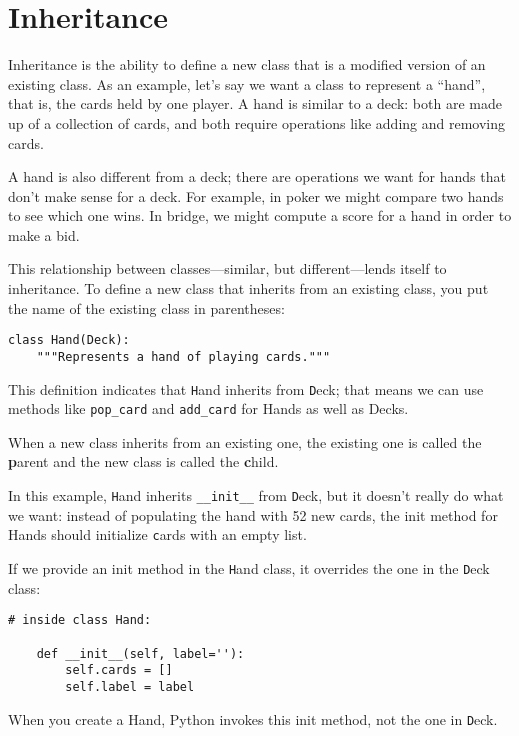 \documentclass[
DIV=11,
fontsize=13,
twoside,
headinclude=false,
titlepage=firstiscover,
abstract=true,
headsepline=true,
footsepline=true,
chapterprefix=true, %
headings=big,
bibliography=totoc,%
captions=tableheading
]{scrbook}
\theoremstyle{definition}
\begin{document}
\section{Inheritance}

Inheritance is the ability to define a new class that is a modified
version of an existing class.  As an example, let's say we want a
class to represent a ``hand'', that is, the cards held by one player.
A hand is similar to a deck: both are made up of a collection of
cards, and both require operations like adding and removing cards.

A hand is also different from a deck; there are operations we want for
hands that don't make sense for a deck.  For example, in poker we
might compare two hands to see which one wins.  In bridge, we might
compute a score for a hand in order to make a bid.

This relationship between classes---similar, but different---lends
itself to inheritance.
To define a new class that inherits from an existing class,
you put the name of the existing class in parentheses:

\begin{lstlisting}
class Hand(Deck):
    """Represents a hand of playing cards."""
\end{lstlisting}
%
This definition indicates that {\texttt Hand} inherits from {\texttt Deck};
that means we can use methods like \verb"pop_card" and \verb"add_card"
for Hands as well as Decks.

When a new class inherits from an existing one, the existing
one is called the {\textbf parent} and the new class is
called the {\textbf child}.

In this example, {\texttt Hand} inherits \verb"__init__" from {\texttt Deck},
but it doesn't really do what we want: instead of populating the hand
with 52 new cards, the init method for Hands should initialize {\texttt
  cards} with an empty list.   

If we provide an init method in the {\texttt Hand} class, it overrides the
one in the {\texttt Deck} class:

\begin{lstlisting}
# inside class Hand:

    def __init__(self, label=''):
        self.cards = []
        self.label = label
\end{lstlisting}
%
When you create a Hand, Python invokes this init method, not the
one in {\texttt Deck}.
\end{document}
